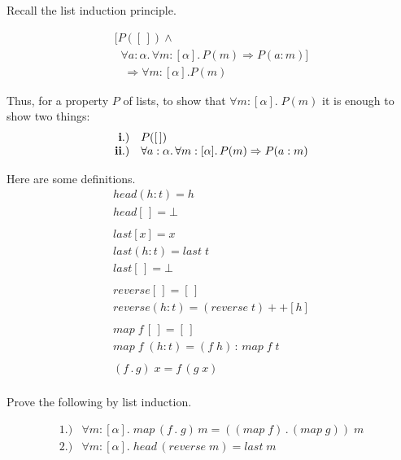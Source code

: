\documentclass[11pt]{article}
\begin{document}


Recall the list induction principle.

\[\begin{array}{l}

[P([\,]) \wedge \\
\;\;\forall a:\alpha.\, \forall m:[\alpha].\, P(m) \Rightarrow P(a:m)] \\
\;\;\; \Rightarrow \forall{}m:[\alpha]. P(m)
\end{array}\]

Thus, for a property $P$ of lists, to show that $\forall{}m:[\alpha].\; P(m)$
it is enough to show two things:
\[\begin{array}{rl}
{\bf{i.)}} & P([\,]) \\
{\bf{ii.)}} & \forall a:\alpha.\, \forall m:[\alpha].\, P(m) \Rightarrow P(a:m)\\
\end{array}\]

Here are some definitions.
\[\begin{array}{l}

head (h:t) = h \\
head [\,] = \bot \\
\ \\
last [x] = x \\
last (h:t) = last \; t \\
last [\,] = \bot \\
\ \\
reverse [\,] = [\,]\\
reverse (h:t) = (reverse \; t ) ++ [h] \\
\ \\
map\; f\, [\,] = [\,] \\
map \; f \; (h:t) = (f\; h)\, :\, map \; f \; t \\
\ \\
(f\, .\, g)\; x = f\, (g\; x)\\

\end{array}\]


Prove the following by list induction.

\[\begin{array}{ll}
1.) & \forall{}m \!:\![\alpha].\; map \,(f\, .\; g)\, m = ((map\; f)\, .\, (map\; g))\; m\\
2.) & \forall{}m \!:\![\alpha].\; head\, (reverse \; m) = last \; m \\
\end{array}
\]
\end{document}

